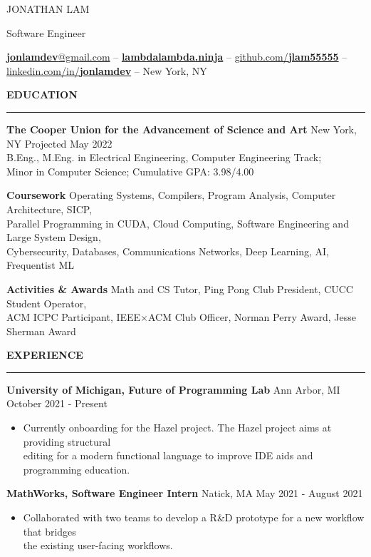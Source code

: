 \documentclass[]{article}
\newcommand{\br}{\vspace{10pt}}
\newcommand{\brs}{\vspace{3pt}}
\newcommand{\hr}{\vspace{4pt}\hrule\vspace{4pt}}
\begin{document}
\thispagestyle{empty}

{\LARGE JONATHAN LAM}

Software Engineer

\href{mailto:jonlamdev@gmail.com}{\textbf{jonlamdev}@gmail.com} --
\href{https://lambdalambda.ninja}{\textbf{lambdalambda.ninja}} --
\href{https://github.com/jlam55555}{github.com/\textbf{jlam55555}} --
\href{https://linkedin.com/in/jonlamdev}{linkedin.com/in/\textbf{jonlamdev}} --
New York, NY

\br
\textbf{EDUCATION}
\hr
\textbf{The Cooper Union for the Advancement of Science and Art}
New York, NY
\hfill
Projected May 2022\\
B.Eng., M.Eng. in Electrical Engineering, Computer Engineering Track;\\
Minor in Computer Science; Cumulative GPA: 3.98/4.00

\brs

\textbf{Coursework} Operating Systems, Compilers, Program Analysis, Computer
Architecture, SICP,\\
Parallel Programming in CUDA, Cloud Computing, Software Engineering and Large
System Design,\\
Cybersecurity, Databases, Communications Networks, Deep Learning, AI, Frequentist ML

\brs

\textbf{Activities \& Awards} Math and CS Tutor, Ping Pong Club President, CUCC
Student Operator, \\ ACM ICPC Participant, IEEE$\times$ACM Club Officer, Norman
Perry Award, Jesse Sherman Award

\br

\textbf{EXPERIENCE}
\hr

\textbf{University of Michigan, Future of Programming Lab}
Ann Arbor, MI
\hfill
October 2021 - Present
\begin{itemize}
\item Currently onboarding for the Hazel project. The Hazel project aims at providing structural\\
  editing for a modern functional language to improve IDE aids and programming education.
\end{itemize}

\brs

\textbf{MathWorks, Software Engineer Intern}
Natick, MA
\hfill
May 2021 - August 2021
\begin{itemize}
\item Collaborated with two teams to develop a R\&D prototype for a new workflow that bridges\\
  the existing user-facing workflows.
\end{itemize}
\end{document}
